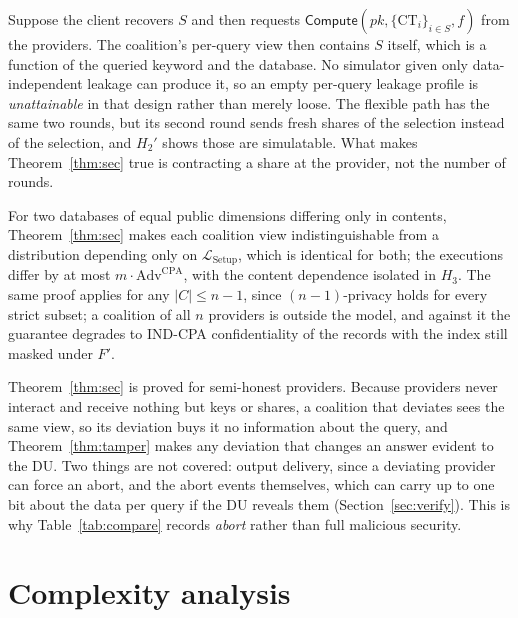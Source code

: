 \documentclass[a4paper,fleqn]{cas-sc}
\newcommand{\Leak}{\mathcal{L}}
\newcommand{\Compute}{\mathsf{Compute}}
\begin{document}
\begin{remark}
\label{rem:v1}
Suppose the client recovers $S$ and then requests
$\Compute(pk,\{\text{CT}_i\}_{i\in S},f)$ from the providers. The coalition's
per-query view then contains $S$ itself, which is a function of the queried
keyword and the database. No simulator given only data-independent leakage can
produce it, so an empty per-query leakage profile is \emph{unattainable} in
that design rather than merely loose. The flexible path has the same two
rounds, but its second round sends fresh shares of the selection instead of
the selection, and $H_2'$ shows those are simulatable. What makes
Theorem~\ref{thm:sec} true is contracting a share at the provider, not the
number of rounds.
\end{remark}

\begin{remark}
For two databases of equal public dimensions differing only in contents,
Theorem~\ref{thm:sec} makes each coalition view indistinguishable from a
distribution depending only on $\Leak_{\mathrm{Setup}}$, which is identical
for both; the executions differ by at most $m\cdot\mathrm{Adv}^{\mathrm{CPA}}$,
with the content dependence isolated in $H_3$. The same proof applies for any
$|C|\le n-1$, since $(n{-}1)$-privacy holds for every strict subset; a
coalition of all $n$ providers is outside the model, and against it the
guarantee degrades to IND-CPA confidentiality of the records with the index
still masked under $F'$.
\end{remark}

\begin{remark}
Theorem~\ref{thm:sec} is proved for semi-honest providers. Because providers
never interact and receive nothing but keys or shares, a coalition that
deviates sees the same view, so its deviation buys it no information about the
query, and Theorem~\ref{thm:tamper} makes any deviation that changes an answer
evident to the DU. Two things are not covered: output delivery, since a
deviating provider can force an abort, and the abort events themselves, which
can carry up to one bit about the data per query if the DU reveals them
(Section~\ref{sec:verify}). This is why Table~\ref{tab:compare} records
\emph{abort} rather than full malicious security.
\end{remark}

\section{Complexity analysis}
\label{sec:complexity}
\end{document}
